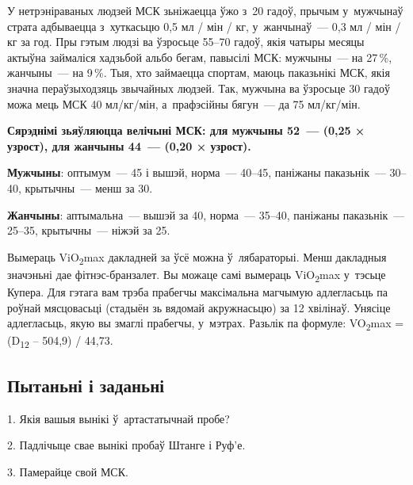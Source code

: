 
У нетрэніраваных людзей МСК зьніжаецца ўжо з~20 гадоў, прычым у~мужчынаў страта адбываецца з~хуткасьцю 0,5 мл / мін / кг, у~жанчынаў~--- 0,3 мл / мін / кг за год. Пры гэтым людзі ва ўзросьце 55--70 гадоў, якія чатыры месяцы актыўна займаліся хадзьбой альбо бегам, павысілі МСК: мужчыны~--- на 27\,\%, жанчыны~--- на 9\,\%. Тыя, хто займаецца спортам, маюць паказьнікі МСК, якія значна пераўзыходзяць звычайных людзей. Так, мужчына ва ўзросьце 30 гадоў можа мець МСК 40 мл/кг/мін, а~прафэсійны бягун~--- да 75 мл/кг/мін.

\textbf{Сярэднімі зьяўляюцца велічыні МСК: для мужчыны 52~--- (0,25 × узрост), для жанчыны 44~--- (0,20 × узрост).} 

\textbf{Мужчыны}: оптымум~--- 45 і вышэй, норма~--- 40--45, паніжаны паказьнік~--- 30--40, крытычны~--- менш за 30. 

\textbf{Жанчыны}: аптымальна~--- вышэй за 40, норма~--- 35--40, паніжаны паказьнік~--- 25--35, крытычны~--- ніжэй за 25.

Вымераць ViO\textsubscript{2}max дакладней за ўсё можна ў~лябараторыі. Менш дакладныя значэньні дае фітнэс-бранзалет. Вы можаце самі вымераць ViO\textsubscript{2}max у~тэсьце Купера. Для гэтага вам трэба прабегчы максімальна магчымую адлегласьць па роўнай мясцовасьці (стадыён зь вядомай акружнасьцю) за 12 хвілінаў. Унясіце адлегласьць, якую вы змаглі прабегчы, у~мэтрах. Разьлік па формуле: VO\textsubscript{2}max = (D\textsubscript{12} -- 504,9) / 44,73.

\subsection*{Пытаньні і заданьні}

1. Якія вашыя вынікі ў~артастатычнай пробе?

2. Падлічыце свае вынікі пробаў Штанге і Руф'е.

3. Памерайце свой МСК.

